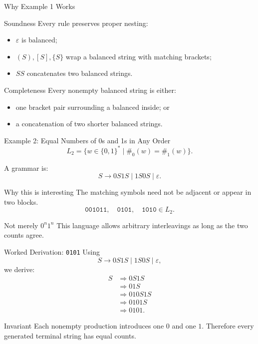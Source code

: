 \documentclass[aspectratio=169,10pt]{beamer}
\newcommand{\eps}{\varepsilon}
\newcommand{\der}{\Rightarrow}
\newcommand{\code}[1]{\texttt{#1}}
\begin{document}
\begin{frame}{Why Example 1 Works}
\small
\begin{block}{Soundness}
Every rule preserves proper nesting:
\begin{itemize}
    \item \(\eps\) is balanced;
    \item \((S),[S],\{S\}\) wrap a balanced string with matching brackets;
    \item \(SS\) concatenates two balanced strings.
\end{itemize}
\end{block}

\begin{exampleblock}{Completeness}
Every nonempty balanced string is either:
\begin{itemize}
    \item one bracket pair surrounding a balanced inside; or
    \item a concatenation of two shorter balanced strings.
\end{itemize}
\end{exampleblock}
\end{frame}

\begin{frame}{Example 2: Equal Numbers of 0s and 1s in Any Order}
\small
\[
L_2=\{w\in\{0,1\}^*\mid \#_0(w)=\#_1(w)\}.
\]

A grammar is:
\[
S\to 0S1S\mid 1S0S\mid\eps.
\]

\begin{block}{Why this is interesting}
The matching symbols need not be adjacent or appear in two blocks.
\[
\code{001011},\quad \code{0101},\quad \code{1010}\in L_2.
\]
\end{block}

\begin{alertblock}{Not merely \(0^n1^n\)}
This language allows arbitrary interleavings as long as the two counts agree.
\end{alertblock}
\end{frame}

\begin{frame}{Worked Derivation: \code{0101}}
\small
Using
\[
S\to 0S1S\mid 1S0S\mid\eps,
\]
we derive:
\begin{align*}
S
&\der 0S1S\\
&\der 01S\\
&\der 010S1S\\
&\der 0101S\\
&\der 0101.
\end{align*}

\begin{exampleblock}{Invariant}
Each nonempty production introduces one \(0\) and one \(1\). Therefore every generated terminal string has equal counts.
\end{exampleblock}
\end{frame}
\end{document}
